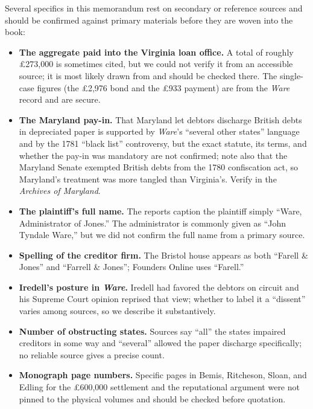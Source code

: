 \documentclass[12pt]{article}
\begin{document}
Several specifics in this memorandum rest on secondary or reference sources and
should be confirmed against primary materials before they are woven into the book:

\begin{itemize}
  \item \textbf{The aggregate paid into the Virginia loan office.} A total of
    roughly \pounds273{,}000 is sometimes cited, but we could not verify it from an
    accessible source; it is most likely drawn from \citet[349--360]{evans1971private}
    and should be checked there. The single-case figures (the \pounds2{,}976 bond
    and the \pounds933 payment) are from the \emph{Ware} record and are secure.
  \item \textbf{The Maryland pay-in.} That Maryland let debtors discharge British
    debts in depreciated paper is supported by \emph{Ware}'s ``several other
    states'' language and by the 1781 ``black list'' controversy, but the exact
    statute, its terms, and whether the pay-in was mandatory are not confirmed;
    note also that the Maryland Senate exempted British debts from the 1780
    confiscation act, so Maryland's treatment was more tangled than Virginia's.
    Verify in the \emph{Archives of Maryland}.
  \item \textbf{The plaintiff's full name.} The reports caption the plaintiff simply
    ``Ware, Administrator of Jones.'' The administrator is commonly given as ``John
    Tyndale Ware,'' but we did not confirm the full name from a primary source.
  \item \textbf{Spelling of the creditor firm.} The Bristol house appears as both
    ``Farell \& Jones'' and ``Farrell \& Jones''; Founders Online uses ``Farell.''
  \item \textbf{Iredell's posture in \emph{Ware}.} Iredell had favored the debtors
    on circuit and his Supreme Court opinion reprised that view; whether to label it
    a ``dissent'' varies among sources, so we describe it substantively.
  \item \textbf{Number of obstructing states.} Sources say ``all'' the states
    impaired creditors in some way and ``several'' allowed the paper discharge
    specifically; no reliable source gives a precise count.
  \item \textbf{Monograph page numbers.} Specific pages in Bemis, Ritcheson, Sloan,
    and Edling for the \pounds600{,}000 settlement and the reputational argument were
    not pinned to the physical volumes and should be checked before quotation.
\end{itemize}



\end{document}
